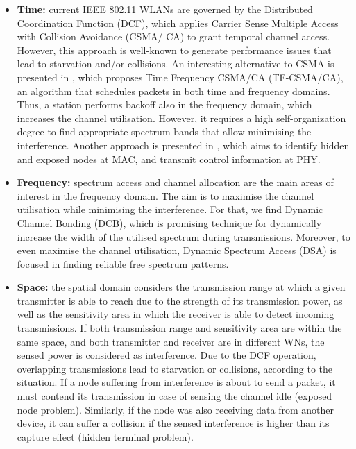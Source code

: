 \documentclass[12pt, a4paper,twoside]{tesi_upf}
\begin{document}
			\begin{itemize}
				\item \textbf{Time:} current IEEE 802.11 WLANs are governed by the Distributed Coordination Function (DCF), which applies Carrier Sense Multiple Access with Collision Avoidance (CSMA/ CA) to grant temporal channel access. However, this approach is well-known to generate performance issues that lead to starvation and/or collisions. An interesting alternative to CSMA is presented in \cite{herzen2015csma}, which proposes Time Frequency CSMA/CA (TF-CSMA/CA), an algorithm that schedules packets in both time and frequency domains. Thus, a station performs backoff also in the frequency domain, which increases the channel utilisation. However, it requires a high self-organization degree to find appropriate spectrum bands that allow minimising the interference. Another approach is presented in \cite{wang2012combating}, which aims to identify hidden and exposed nodes at MAC, and transmit control information at PHY.			
				\item \textbf{Frequency:} spectrum access and channel allocation are the main areas of interest in the frequency domain. The aim is to maximise the channel utilisation while minimising the interference. For that, we find Dynamic Channel Bonding (DCB), which is promising technique for dynamically increase the width of the utilised spectrum during transmissions. Moreover, to even maximise the channel utilisation, Dynamic Spectrum Access (DSA) is focused in finding reliable free spectrum patterns.
				\item \textbf{Space:} the spatial domain considers the transmission range at which a given transmitter is able to reach due to the strength of its transmission power, as well as the sensitivity area in which the receiver is able to detect incoming transmissions. If both transmission range and sensitivity area are within the same space, and both transmitter and receiver are in different WNs, the sensed power is considered as interference. Due to the DCF operation, overlapping transmissions lead to starvation or collisions, according to the situation. If a node suffering from interference is about to send a packet, it must contend its transmission in case of sensing the channel idle (exposed node problem). Similarly, if the node was also receiving data from another device, it can suffer a collision if the sensed interference is higher than its capture effect (hidden terminal problem).
			\end{itemize}		
				
\end{document}
